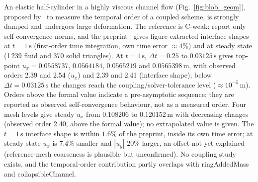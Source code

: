 An elastic half-cylinder in a highly viscous channel flow (Fig.~\ref{fig:blob_geom}), proposed by~\citet{Liu2014} to measure the temporal order of a coupled scheme, is strongly damped and undergoes large deformation.
The reference is C-weak: \citet{Liu2014} report only self-convergence norms, and the preprint~\citep{Liu2013} gives figure-extracted interface shapes at $t = 1\,\mathrm{s}$ (first-order time integration, own time error $\approx4\%$) and at steady state (1\,239 fluid and 370 solid triangles).
At $t = 1\,\mathrm{s}$, $\Delta t = 0.25$ to $0.03125\,\mathrm{s}$ gives top-point $u_x = 0.0558737$, $0.0564184$, $0.0565219$ and $0.0565398\,\mathrm{m}$, with observed orders 2.39 and 2.54 ($u_x$) and 2.39 and 2.41 (interface shape); below $\Delta t = 0.03125\,\mathrm{s}$ the changes reach the coupling/solver-tolerance level ($\approx10^{-5}\,\mathrm{m}$).
Orders above the formal value indicate a pre-asymptotic sequence; they are reported as observed self-convergence behaviour, not as a measured order.
Four mesh levels give steady $u_x$ from $0.108206$ to $0.120152\,\mathrm{m}$ with decreasing changes (observed order 2.40, above the formal value); no extrapolated value is given.
The $t = 1\,\mathrm{s}$ interface shape is within $1.6\%$ of the preprint, inside its own time error; at steady state $u_x$ is $7.4\%$ smaller and $|u_y|$ $20\%$ larger, an offset not yet explained (reference-mesh coarseness is plausible but unconfirmed).
No coupling study exists, and the temporal-order contribution partly overlaps with ringAddedMass and collapsibleChannel.
